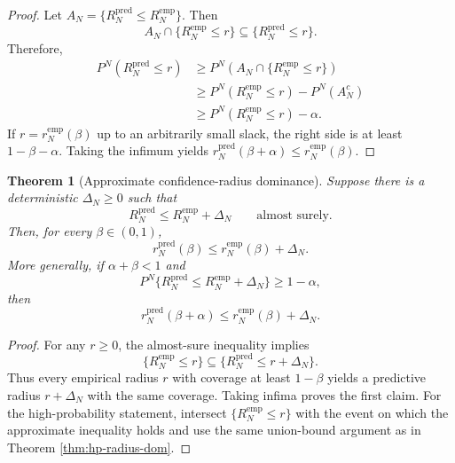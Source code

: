 \documentclass[11pt]{article}
\newtheorem{theorem}{Theorem}[section]
\newcommand{\1}{\mathbf{1}}
\newcommand{\remp}{r_N^{\mathrm{emp}}}
\newcommand{\rpred}{r_N^{\mathrm{pred}}}
\begin{document}
\begin{proof}
Let $A_N=\{R_N^{\mathrm{pred}}\le R_N^{\mathrm{emp}}\}$. Then
\begin{equation}
    A_N\cap\{R_N^{\mathrm{emp}}\le r\}\subseteq\{R_N^{\mathrm{pred}}\le r\}.
\end{equation}
Therefore,
\begin{align*}
P^N(R_N^{\mathrm{pred}}\le r)
&\ge P^N(A_N\cap\{R_N^{\mathrm{emp}}\le r\})\\
&\ge P^N(R_N^{\mathrm{emp}}\le r)-P^N(A_N^c)\\
&\ge P^N(R_N^{\mathrm{emp}}\le r)-\alpha.
\end{align*}
If $r=\remp(\beta)$ up to an arbitrarily small slack, the right side is at least $1-\beta-\alpha$. Taking the infimum yields $\rpred(\beta+\alpha)\le\remp(\beta)$.
\end{proof}

\begin{theorem}[Approximate confidence-radius dominance]\label{thm:approx-radius-dom}
Suppose there is a deterministic $\Delta_N\ge0$ such that
\begin{equation}
    R_N^{\mathrm{pred}}\le R_N^{\mathrm{emp}}+\Delta_N
    \qquad\text{almost surely.}
\end{equation}
Then, for every $\beta\in(0,1)$,
\begin{equation}
    \rpred(\beta)\le \remp(\beta)+\Delta_N.
\end{equation}
More generally, if $\alpha+\beta<1$ and
\begin{equation}
P^N\{R_N^{\mathrm{pred}}\le R_N^{\mathrm{emp}}+\Delta_N\}\ge1-\alpha,
\end{equation}
then
\begin{equation}
    \rpred(\beta+\alpha)\le \remp(\beta)+\Delta_N.
\end{equation}
\end{theorem}

\begin{proof}
For any $r\ge0$, the almost-sure inequality implies
\begin{equation}
\{R_N^{\mathrm{emp}}\le r\}\subseteq
\{R_N^{\mathrm{pred}}\le r+\Delta_N\}.
\end{equation}
Thus every empirical radius $r$ with coverage at least $1-\beta$ yields a predictive radius $r+\Delta_N$ with the same coverage. Taking infima proves the first claim. For the high-probability statement, intersect $\{R_N^{\mathrm{emp}}\le r\}$ with the event on which the approximate inequality holds and use the same union-bound argument as in Theorem \ref{thm:hp-radius-dom}.
\end{proof}
\end{document}

